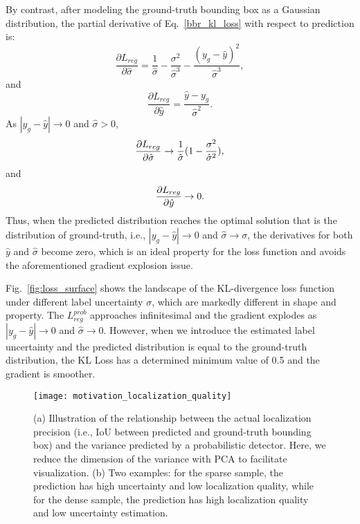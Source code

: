 \documentclass[twocolumn]{svjour3}
\newcommand{\revise}[1]{\textcolor{black}{#1}}
\begin{document}
By contrast, after modeling the ground-truth bounding box as a Gaussian distribution, the partial derivative of Eq.~\eqref{bbr_kl_loss} with respect to prediction is:
\begin{equation}
\frac{\partial L_{reg}}{\partial \hat{\sigma } } =\frac{1}{\hat{\sigma}} -\frac{\sigma^2}{\hat{\sigma}^3} - \frac{(y_g-\hat{y})^2}{\hat{\sigma}^3},
\end{equation}
and
\begin{equation}
\frac{\partial L_{reg}}{\partial \hat{y} } = \frac{\hat{y}-y_g}{\hat{\sigma}^2}.
\end{equation}
As $|y_g-\hat{y}|\to0$ and $\hat{\sigma}>0$,
\begin{equation}
\frac{\revise{\partial L_{reg}}}{\partial \hat{\sigma } } \to \frac{1}{\hat{\sigma}}(1-\frac{\sigma^2}{\hat{\sigma}^2}),
\end{equation}
and
\begin{equation}
\frac{\revise{\partial L_{reg}}}{\partial \hat{y} } \to 0.
\end{equation}
Thus, when the predicted distribution reaches the optimal solution that is the distribution of ground-truth, i.e., $|y_g-\hat{y}|\to0$ and $\hat{\sigma}\to\sigma$, the derivatives for both $\hat{y}$ and $\hat{\sigma}$ become zero, which is an ideal property for the loss function and avoids the aforementioned gradient explosion issue.

Fig.~\ref{fig:loss_surface} shows the landscape of the KL-divergence loss function under different label uncertainty $\sigma$, which are markedly different in shape and property. 
The $L_{reg}^{prob}$ approaches infinitesimal and the gradient explodes as $|y_g-\hat{y}|\to0$ and $\hat{\sigma}\to0$. However, when we introduce the estimated label uncertainty and the predicted distribution is equal to the ground-truth distribution, the KL Loss has a determined minimum value of 0.5 and the gradient is smoother.

\begin{figure*}[htp]
\centering
\texttt{[image: motivation\_localization\_quality]} \caption{(a) Illustration of the relationship between the actual localization precision (i.e., IoU between predicted and ground-truth bounding box) and the variance predicted by a probabilistic detector. Here, we reduce the dimension of the variance with PCA to facilitate visualization. (b) Two examples: for the sparse sample, the prediction has high uncertainty and low localization quality, while for the dense sample, the prediction has high localization quality and low uncertainty estimation.}
\label{fig:motivation_quality}
\end{figure*}
\end{document}

